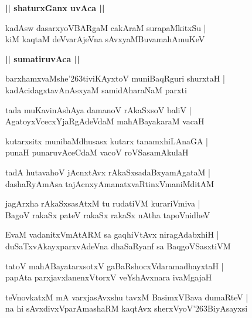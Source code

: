 \documentclass[twoside,12pt,openright]{book}
\def\S{\char'263}
\newcounter{shloka}[chapter]
\def\uvaca#1{\centerline{{\large\textbf{#1}}}}
\begin{document}
\uvaca{|| shaturxGanx uvAca ||}

\begin{shloka}%
kadAsw dasarxyoVBARgaM cakAraM surapaMkitxSu |\\
kiM kaqtaM deVvarAjeVna sAvxyaMBuvamahAmuKeV
\end{shloka}
\uvaca{|| sumatiruvAca ||}

\begin{shloka}%
barxhamxvaMshe\S tiviKAyxtoV muniBaqRguri shurxtaH |\\
kadAcidagxtavAnAsxyaM samidAharaNaM parxti
\end{shloka}

\begin{shloka}%
tada muKavinAshAya damanoV rAkaSxsoV baliV |\\
AgatoyxVcecxYjaRgAdeVdaM mahABayakaraM vacaH 
\end{shloka}

\begin{shloka}%
kutarxsitx munibaMdhusasx kutarx tanamxhiLAnaGA |\\
punaH punaruvAceCdaM vacoV roVSasamAkulaH 
\end{shloka}

\begin{shloka}%
tadA hutavahoV jAcnxtAvx rAkaSxsadaBxyamAgataM |\\
dashaRyAmAsa tajAcnxyAmanatxvaRtinxVmaniMditAM 
\end{shloka}

\begin{shloka}%
jagArxha rAkaSxsasAtxM tu rudatiVM kurariVmiva |\\
BagoV rakaSx pateV rakaSx rakaSx nAtha tapoVnidheV
\end{shloka}

\begin{shloka}%
EvaM vadanitxVmAtARM sa gaqhiVtAvx niragAdabxhiH |\\
duSaTxvAkayxparxvAdeVna dhaSaRyanf sa BaqgoVSasxtiVM 
\end{shloka}

\begin{shloka}%
tatoV mahABayatarxsotxV gaBaRshocxVdaramadhayxtaH |\\
papAta parxjavxlanenxVtorxV veYshAvxnara ivaMgajaH 
\end{shloka}

\begin{shloka}%
teVnovkatxM mA varxjasAvxshu tavxM BasimxVBava dumaRteV |\\
na hi sAvxdivxVparAmashaRM kaqtAvx sherxVyoV\S BiyAsayxsi 
\end{shloka}
\end{document}
